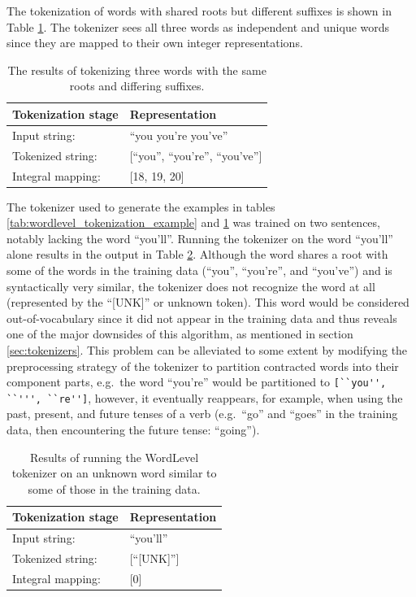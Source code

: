 \documentclass[12pt]{article}
\begin{document}
The tokenization of words with shared roots but different suffixes is shown in Table \ref{tab:wordlevel_tokenization_shared_roots_example}. The
tokenizer sees all three words as independent and unique words since they are mapped to their own integer representations.

\begin{table}[!t]
    \centering
    \begin{tabular}{l l}
        \toprule
        Tokenization stage & Representation                    \\
        \midrule
        Input string:      & ``you you're you've''             \\
        Tokenized string:  & [``you'', ``you're'', ``you've''] \\
        Integral mapping:  & [18, 19, 20]                      \\
        \bottomrule
    \end{tabular}
    \caption{The results of tokenizing three words with the same roots and differing suffixes.}
    \label{tab:wordlevel_tokenization_shared_roots_example}
\end{table}

The tokenizer used to generate the examples in tables \ref{tab:wordlevel_tokenization_example} and
\ref{tab:wordlevel_tokenization_shared_roots_example} was trained on two sentences, notably lacking the word ``you'll''. Running the tokenizer on the
word ``you'll'' alone results in the output in Table \ref{tab:wordlevel_unk_word}. Although the word shares a root with some of the words in the
training data (``you'', ``you're'', and ``you've'') and is syntactically very similar, the tokenizer does not recognize the word at all (represented
by the ``[UNK]'' or unknown token). This word would be considered out-of-vocabulary since it did not appear in the training data and thus reveals one
of the major downsides of this algorithm, as mentioned in section \ref{sec:tokenizers}. This problem can be alleviated to some extent by modifying the
preprocessing strategy of the tokenizer to partition contracted words into their component parts, e.g.~the word ``you're'' would be partitioned to
\lstinline|[``you'', ``''', ``re'']|, however, it eventually reappears, for example, when using the past, present, and future tenses of a verb
(e.g.~``go'' and ``goes'' in the training data, then encountering the future tense: ``going'').

\begin{table}[!t]
    \centering
    \begin{tabular}{l l}
        \toprule
        Tokenization stage & Representation \\
        \midrule
        Input string:      & ``you'll''     \\
        Tokenized string:  & [``[UNK]'']    \\
        Integral mapping:  & [0]            \\
        \bottomrule
    \end{tabular}
    \caption{Results of running the WordLevel tokenizer on an unknown word similar to some of those in the training data.}
    \label{tab:wordlevel_unk_word}
\end{table}
\end{document}
